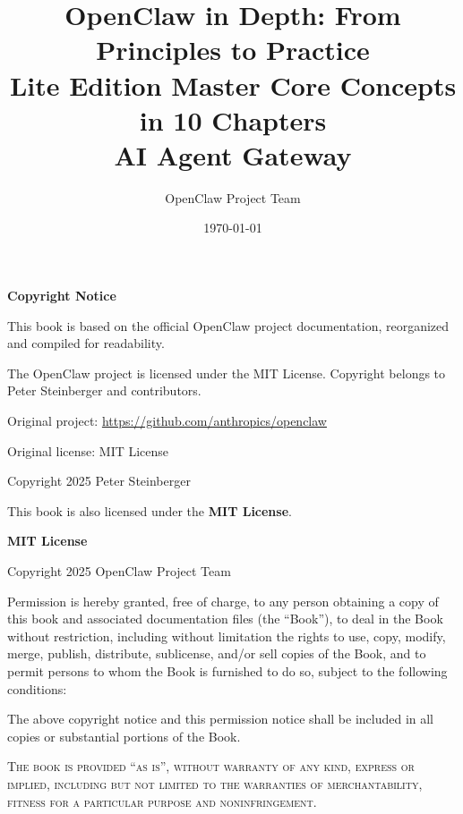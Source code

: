 \documentclass[a4paper,12pt,openany]{book}
\title{
    \vspace{2cm}
{\Huge\textbf{OpenClaw in Depth: From Principles to Practice}} \\
    \vspace{0.5cm}
    {\Large Lite Edition \textperiodcentered{} Master Core Concepts in 10 Chapters} \\
    \vspace{0.5cm}
    {\large AI Agent Gateway}
    \vspace{2cm}
}
\author{OpenClaw Project Team}
\date{\today}
\begin{document}
\maketitle
\thispagestyle{empty}

\clearpage
\thispagestyle{empty}
\vspace*{\fill}
\begin{center}
{\large\textbf{Copyright Notice}}
\end{center}

\bigskip

\noindent This book is based on the official OpenClaw project documentation, reorganized and compiled for readability.

\medskip

\noindent The OpenClaw project is licensed under the MIT License. Copyright belongs to Peter Steinberger and contributors.

\medskip

\noindent Original project: \url{https://github.com/anthropics/openclaw}

\noindent Original license: MIT License

\noindent Copyright \textcopyright{} 2025 Peter Steinberger

\bigskip

\noindent This book is also licensed under the \textbf{MIT License}.

\bigskip

\noindent \textbf{MIT License}

\medskip

\noindent Copyright \textcopyright{} 2025 OpenClaw Project Team

\medskip

\noindent Permission is hereby granted, free of charge, to any person obtaining a copy
of this book and associated documentation files (the ``Book''), to deal
in the Book without restriction, including without limitation the rights
to use, copy, modify, merge, publish, distribute, sublicense, and/or sell
copies of the Book, and to permit persons to whom the Book is furnished to
do so, subject to the following conditions:

\medskip

\noindent The above copyright notice and this permission notice shall be included in all
copies or substantial portions of the Book.

\medskip

\noindent \textsc{The book is provided ``as is'', without warranty of any kind, express or
implied, including but not limited to the warranties of merchantability,
fitness for a particular purpose and noninfringement.}

\vspace*{\fill}

\tableofcontents
\clearpage












\end{document}

